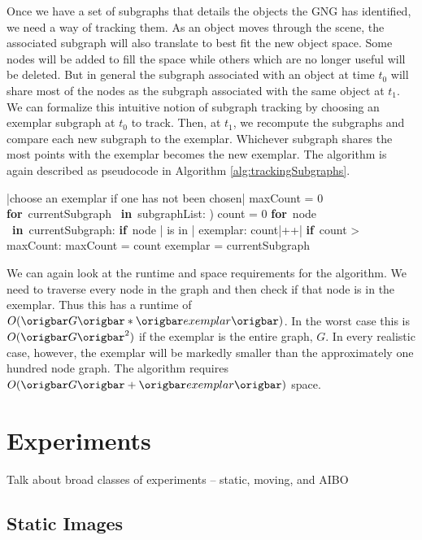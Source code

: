 \documentclass{article}
\renewcommand{\|}{\origbar} %
\renewcommand{\FOR}{\mbox{{\bf for} }\tab}
\renewcommand{\IF}{\mbox{{\bf if} }\tab}
\newcommand{\IN}{\mbox{ {\bf in} }}
\begin{document}
Once we have a set of subgraphs that details the objects the GNG has identified, we need a way of tracking them. As an object moves through the scene, the associated subgraph will also translate to best fit the new object space. Some nodes will be added to fill the space while others which are no longer useful will be deleted. But in general the subgraph associated with an object at time $t_0$ will share most of the nodes as the subgraph associated with the same object at $t_1$. We can formalize this intuitive notion of subgraph tracking by choosing an exemplar subgraph at $t_0$ to track. Then, at $t_1$, we recompute the subgraphs and compare each new subgraph to the exemplar. Whichever subgraph shares the most points with the exemplar becomes the new exemplar. The algorithm is again described as pseudocode in Algorithm \ref{alg:trackingSubgraphs}.

\begin{Algorithm}[h!]
\begin{program}
  |choose an exemplar if one has not been chosen|
  maxCount = 0
  \FOR currentSubgraph \IN subgraphList: )
    count = 0
    \FOR node \IN currentSubgraph:
      \IF node | is in | exemplar:
        count|++| \untab \untab
    \IF count > maxCount:
      maxCount = count
      exemplar = currentSubgraph
\end{program}
\caption{Pseudocode for Tracking Subgraphs}
\label{alg:trackingSubgraphs}
\end{Algorithm}

We can again look at the runtime and space requirements for the algorithm. We need to traverse every node in the graph and then check if that node is in the exemplar. Thus this has a runtime of $O(\|G\|*\|exemplar\|)$. In the worst case this is $O(\|G\|^2)$ if the exemplar is the entire graph, $G$. In every realistic case, however, the exemplar will be markedly smaller than the approximately one hundred node graph. The algorithm requires $O(\|G\|+\|exemplar\|)$ space.

\section{Experiments}

Talk about broad classes of experiments -- static, moving, and AIBO

\subsection{Static Images}
\end{document}
